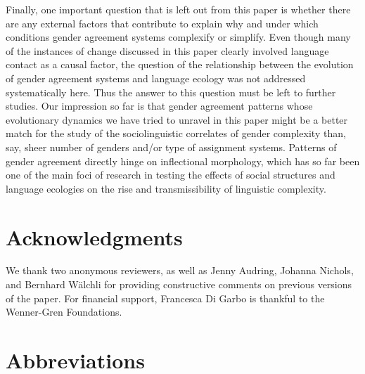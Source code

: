 \documentclass[output=collectionpaper]{langsci/langscibook}
\begin{document}
Finally, one important question that is left out from this paper is whether there are any external factors that contribute to explain why and under which conditions gender agreement systems complexify or simplify. Even though many of the instances of change discussed in this paper clearly involved language contact as a causal factor, the question of the relationship between the evolution of gender agreement systems and language ecology  was not addressed systematically here. Thus the answer to this question must be left to further studies. Our impression so far is that gender agreement patterns \textendash{} whose evolutionary dynamics we have tried to unravel in this paper \textendash{} might be a better match for the study of the sociolinguistic correlates of gender complexity than, say, sheer number of genders and/or type of assignment systems. Patterns of gender agreement directly hinge on inflectional morphology, which has so far been one of the main foci of research in testing the effects of social structures and language ecologies on the rise and transmissibility of linguistic complexity.



\section*{Acknowledgments}
We thank two anonymous reviewers, as well as Jenny Audring, Johanna Nichols, and Bernhard W\"alchli for providing constructive comments on previous versions of the paper. For financial support, Francesca Di Garbo is thankful to the Wenner-Gren Foundations.

\section*{Abbreviations}
\end{document}
